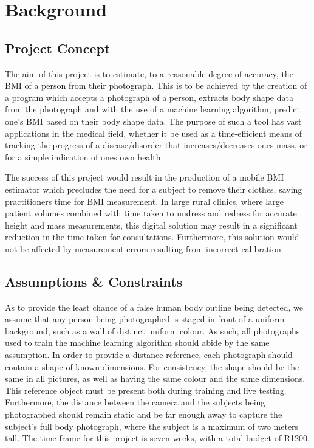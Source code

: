 \section{Background}
\subsection{Project Concept}
The aim of this project is to estimate, to a reasonable degree of accuracy, the BMI of a person from their photograph.
This is to be achieved by the creation of a program which accepts a photograph of a person, extracts body shape data from the photograph and with the use of a machine learning algorithm, predict one's BMI based on their body shape data.
The purpose of such a tool has vast applications in the medical field, whether it be used as a time-efficient means of tracking the progress of a disease/disorder that increases/decreases ones mass, or for a simple indication of ones own health.

The success of this project would result in the production of a mobile BMI estimator which precludes the need for a subject to remove their clothes, saving practitioners time for BMI measurement.
In large rural clinics, where large patient volumes combined with time taken to undress and redress for accurate height and mass measurements, this digital solution may result in a significant reduction in the time taken for consultations.
Furthermore, this solution would not be affected by measurement errors resulting from incorrect calibration.
\subsection{Assumptions \& Constraints}
As to provide the least chance of a false human body outline being detected, we assume that any person being photographed is staged in front of a uniform background, such as a wall of distinct uniform colour.
As such, all photographs used to train the machine learning algorithm should abide by the same assumption.
In order to provide a distance reference, each photograph should contain a shape of known dimensions.
For consistency, the shape should be the same in all pictures, as well as having the same colour and the same dimensions.
This reference object must be present both during training and live testing.
Furthermore, the distance between the camera and the subjects being photographed should remain static and be far enough away to capture the subject's full body photograph, where the subject is a maximum of two meters tall.
The time frame for this project is seven weeks, with a total budget of R1200.
